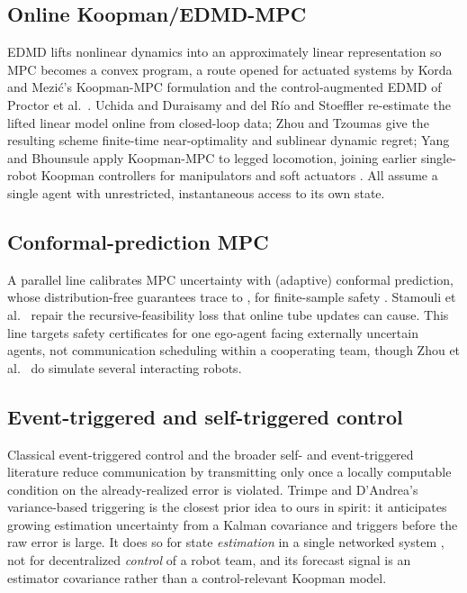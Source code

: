 \documentclass[10pt,conference]{IEEEtran}
\begin{document}
\subsection{Online Koopman/EDMD-MPC}
EDMD \cite{williams2015} lifts nonlinear dynamics into an approximately linear representation so MPC becomes a convex program, a route opened for actuated systems by Korda and Mezi\'c's Koopman-MPC formulation \cite{korda2018} and the control-augmented EDMD of Proctor et al.\ \cite{proctor2016}. Uchida and Duraisamy \cite{uchida2024} and del R\'io and Stoeffler \cite{delrio2025} re-estimate the lifted linear model online from closed-loop data; Zhou and Tzoumas \cite{zhoutzoumas2025} give the resulting scheme finite-time near-optimality and sublinear dynamic regret; Yang and Bhounsule \cite{yang2025} apply Koopman-MPC to legged locomotion, joining earlier single-robot Koopman controllers for manipulators \cite{abraham2019} and soft actuators \cite{bruder2021}. All assume a single agent with unrestricted, instantaneous access to its own state.

\subsection{Conformal-prediction MPC}
A parallel line calibrates MPC uncertainty with (adaptive) conformal prediction, whose distribution-free guarantees trace to \cite{vovk2005}, for finite-sample safety \cite{lindemann2023,nakamura2022,zhouzhangluo2024,chee2024,hsu2025}. Stamouli et al.\ \cite{stamouli2024} repair the recursive-feasibility loss that online tube updates can cause. This line targets safety certificates for one ego-agent facing externally uncertain agents, not communication scheduling within a cooperating team, though Zhou et al.\ \cite{zhouzhangluo2024} do simulate several interacting robots.

\subsection{Event-triggered and self-triggered control}
Classical event-triggered control \cite{tabuada2007} and the broader self- and event-triggered literature \cite{heemels2012,anta2010} reduce communication by transmitting only once a locally computable condition on the already-realized error is violated. Trimpe and D'Andrea's variance-based triggering \cite{trimpe2014} is the closest prior idea to ours in spirit: it anticipates growing estimation uncertainty from a Kalman covariance and triggers before the raw error is large. It does so for state \emph{estimation} in a single networked system \cite{hespanha2007}, not for decentralized \emph{control} of a robot team, and its forecast signal is an estimator covariance rather than a control-relevant Koopman model.
\end{document}
